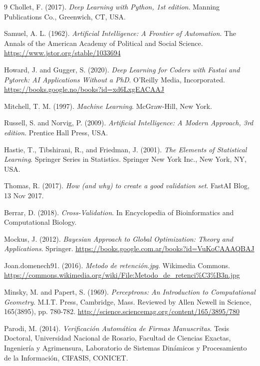 \begin{thebibliography}{9}
Chollet, F. (2017).
\textit{Deep Learning with Python, 1st edition}.
Manning Publications Co., Greenwich, CT, USA.

Samuel, A. L. (1962).
\textit{Artificial Intelligence: A Frontier of Automation}.
The Annals of the American Academy of Political and Social Science.
\url{https://www.jstor.org/stable/1033694}

Howard, J. and Gugger, S. (2020).
\textit{Deep Learning for Coders with Fastai and Pytorch: AI Applications Without a PhD}.
O'Reilly Media, Incorporated.
\url{https://books.google.no/books?id=xd6LxgEACAAJ}

Mitchell, T. M. (1997).
\textit{Machine Learning}.
McGraw-Hill, New York.

Russell, S. and Norvig, P. (2009).
\textit{Artificial Intelligence: A Modern Approach, 3rd edition}.
Prentice Hall Press, USA.

Hastie, T., Tibshirani, R., and Friedman, J. (2001).
\textit{The Elements of Statistical Learning}.
Springer Series in Statistics. Springer New York Inc., New York, NY, USA.

Thomas, R. (2017).
\textit{How (and why) to create a good validation set}.
FastAI Blog, 13 Nov 2017.

Berrar, D. (2018).
\textit{Cross-Validation}.
In Encyclopedia of Bioinformatics and Computational Biology.

Mockus, J. (2012).
\textit{Bayesian Approach to Global Optimization: Theory and Applications}.
Springer.
\url{https://books.google.com.ar/books?id=VuKoCAAAQBAJ}

Joan.domenech91. (2016).
\textit{Metodo de retención.jpg}.
Wikimedia Commons.
\url{https://commons.wikimedia.org/wiki/File:Metodo_de_retenci%C3%B3n.jpg}

Minsky, M. and Papert, S. (1969).
\textit{Perceptrons: An Introduction to Computational Geometry}.
M.I.T. Press, Cambridge, Mass.
Reviewed by Allen Newell in Science, 165(3895), pp. 780-782.
\url{http://science.sciencemag.org/content/165/3895/780}

Parodi, M. (2014).
\textit{Verificación Automática de Firmas Manuscritas}.
Tesis Doctoral, Universidad Nacional de Rosario, Facultad de Ciencias Exactas, Ingeniería y Agrimensura, Laboratorio de Sistemas Dinámicos y Procesamiento de la Información, CIFASIS, CONICET.


\end{thebibliography}
